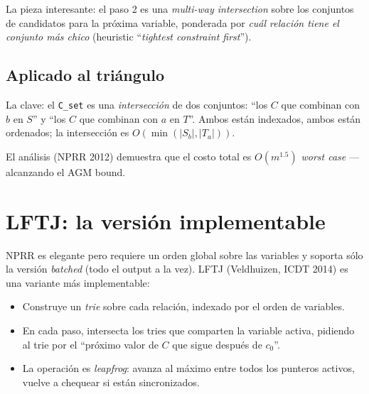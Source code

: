 \noindent
La pieza interesante: el paso 2 es una \emph{multi-way
intersection} sobre los conjuntos de candidatos para la próxima
variable, ponderada por \emph{cuál relación tiene el conjunto más
chico} (heuristic ``\emph{tightest constraint first}'').

\subsection{Aplicado al triángulo}

\begin{algorithm}[H]
\caption{NPRR para triángulo \(R(A,B) \bowtie S(B,C) \bowtie T(A,C)\)}
\end{algorithm}

\noindent
La clave: el \texttt{C\_set} es una \emph{intersección} de dos
conjuntos: ``los \(C\) que combinan con \(b\) en \(S\)'' y ``los
\(C\) que combinan con \(a\) en \(T\)''. Ambos están indexados,
ambos están ordenados; la intersección es \(O(\min(|S_b|, |T_a|))\).

El análisis (NPRR 2012) demuestra que el costo total es
\(O(m^{1.5})\) \emph{worst case} ---alcanzando el AGM bound.

\section{LFTJ: la versión implementable}

NPRR es elegante pero requiere un orden global sobre las variables
y soporta sólo la versión \emph{batched} (todo el output a la vez).
LFTJ (Veldhuizen, ICDT 2014) es una variante más implementable:

\begin{itemize}
    \item Construye un \emph{trie} sobre cada relación, indexado
    por el orden de variables.
    \item En cada paso, intersecta los tries que comparten la
    variable activa, pidiendo al trie por el ``próximo valor de
    \(C\) que sigue después de \(c_0\)''.
    \item La operación es \emph{leapfrog}: avanza al máximo entre
    todos los punteros activos, vuelve a chequear si están
    sincronizados.
\end{itemize}

